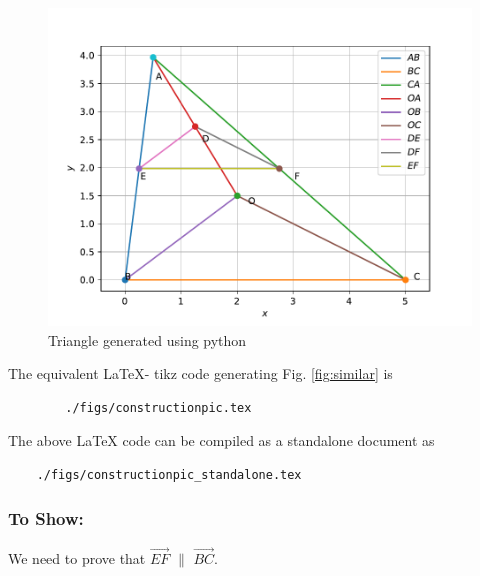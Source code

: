 \begin{enumerate}[label=\thesection.\arabic*.,ref=\thesection.\theenumi]
    \begin{figure}[!ht]
	\centering
	\includegraphics[width=\columnwidth]{./figs/similartrianglefig.pdf}
	\caption{Triangle generated using python}
	\label{fig:triabcpy}
    \end{figure}
      The equivalent \LaTeX{}- tikz code generating Fig. \ref{fig:similar} is
    \begin{lstlisting}
        ./figs/constructionpic.tex
    \end{lstlisting}
	
	The above \LaTeX{} code can be compiled as a standalone document as
	\begin{lstlisting}
	./figs/constructionpic_standalone.tex
	\end{lstlisting}
\end{enumerate}
\subsubsection*{To Show:}    We need to prove that $\vec{EF}$ $\parallel$   $\vec{BC}$.\\

